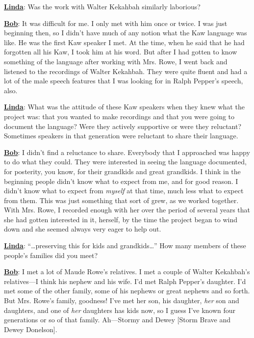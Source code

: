 \documentclass[output=paper]{LSP/langsci}
\begin{document}
\textbf{\underline{Linda}}: Was the work with Walter Kekahbah similarly laborious?

\textbf{\underline{Bob}}: It was difficult for me. I only met with him once or twice. I was just beginning then, so I didn't have much of any notion what the Kaw language was like. He was the first Kaw speaker I met. At the time, when he said that he had forgotten all his Kaw, I took him at his word. But after I had gotten to know something of the language after working with Mrs. Rowe, I went back and listened to the recordings of Walter Kekahbah. They were quite fluent and had a lot of the male speech features that I was looking for in Ralph Pepper's speech, also.

\textbf{\underline{Linda}}: What was the attitude of these Kaw speakers when they knew what the project was: that you wanted to make recordings and that you were going to document the language? Were they actively supportive or were they reluctant? Sometimes speakers in that generation were reluctant to share their language.

\textbf{\underline{Bob}}: I didn't find a reluctance to share. Everybody that I approached was happy to do what they could. They were interested in seeing the language documented, for posterity, you know, for their grandkids and great grandkids. I think in the beginning people didn't know what to expect from me, and for good reason. I didn't know what to expect from \textit{myself} at that time, much less what to expect from them. This was just something that sort of grew, as we worked together. With Mrs. Rowe, I recorded enough with her over the period of several years that she had gotten interested in it, herself, by the time the project began to wind down and she seemed always very eager to help out.

\textbf{\underline{Linda}}: ``\ldots preserving this for kids and grandkids\ldots'' How many members of these people's families did you meet?

\textbf{\underline{Bob}}:  I met a lot of Maude Rowe's relatives. I met a couple of Walter Kekahbah's relatives---I think his nephew and his wife. I'd met Ralph Pepper's daughter. I'd met some of the other family, some of his nephews or great nephews and so forth. But Mrs. Rowe's family, goodness! I've met her son, his daughter, \textit{her} son and daughters, and one of \textit{her} daughters has kids now, so I guess I've known four generations or so of that family. Ah---Stormy and Dewey [Storm Brave and Dewey Donelson].
\end{document}
